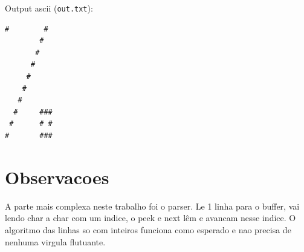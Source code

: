 \documentclass[11pt,a4paper]{article}
\begin{document}
Output ascii (\texttt{out.txt}):
\begin{verbatim}
#        #
        #
       #
      #
     #
    #
   #
  #     ###
 #      # #
#       ###
\end{verbatim}

\section{Observacoes}

A parte mais complexa neste trabalho foi o parser.
Le 1 linha para o buffer, vai lendo char a char com um indice, o peek e next lêm e avancam nesse indice.
O algoritmo das linhas so com inteiros funciona como esperado e nao precisa de nenhuma virgula flutuante.
\end{document}
